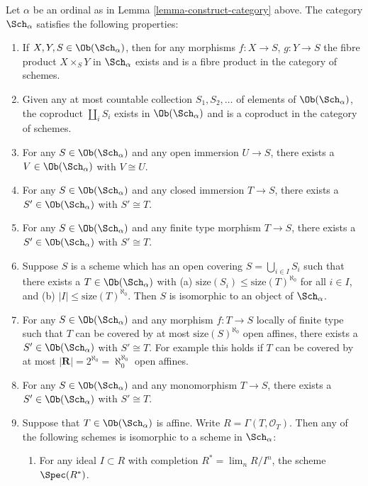 \begin{lemma}
\label{lemma-what-is-in-it}
Let $\alpha$ be an ordinal as in Lemma \ref{lemma-construct-category} above.
The category $\Sch_\alpha$ satisfies the following
properties:
\begin{enumerate}
\item If $X, Y, S \in \Ob(\Sch_\alpha)$, then
for any morphisms $f : X \to S$, $g : Y \to S$ the fibre
product $X \times_S Y$ in $\Sch_\alpha$ exists
and is a fibre product in the category of schemes.
\item Given any at most countable collection $S_1, S_2, \ldots$
of elements of $\Ob(\Sch_\alpha)$, the coproduct
$\coprod_i S_i$ exists in $\Ob(\Sch_\alpha)$ and
is a coproduct in the category of schemes.
\item For any $S \in \Ob(\Sch_\alpha)$ and
any open immersion $U \to S$, there exists a
$V \in \Ob(\Sch_\alpha)$ with $V \cong U$.
\item For any $S \in \Ob(\Sch_\alpha)$ and
any closed immersion $T \to S$, there exists a
$S' \in \Ob(\Sch_\alpha)$ with $S' \cong T$.
\item For any $S \in \Ob(\Sch_\alpha)$ and
any finite type morphism $T \to S$, there exists a
$S' \in \Ob(\Sch_\alpha)$ with $S' \cong T$.
\item Suppose $S$ is a scheme which has an open covering
$S = \bigcup_{i \in I} S_i$ such that there exists
a $T \in \Ob(\Sch_\alpha)$ with
(a) $\text{size}(S_i) \leq \text{size}(T)^{\aleph_0}$ for all
$i \in I$, and (b) $|I| \leq \text{size}(T)^{\aleph_0}$.
Then $S$ is isomorphic to an object of $\Sch_\alpha$.
\item For any $S \in \Ob(\Sch_\alpha)$ and
any morphism $f : T \to S$ locally of finite type such
that $T$ can be covered by at most
$\text{size}(S)^{\aleph_0}$ open affines, there exists a
$S' \in \Ob(\Sch_\alpha)$ with $S' \cong T$.
For example this holds if $T$ can be covered by at most
$|\mathbf{R}| = 2^{\aleph_0} = \aleph_0^{\aleph_0}$ open affines.
\item For any $S \in \Ob(\Sch_\alpha)$ and
any monomorphism $T \to S$, there exists a
$S' \in \Ob(\Sch_\alpha)$ with $S' \cong T$.
\item Suppose that $T \in \Ob(\Sch_\alpha)$ is
affine. Write $R = \Gamma(T, \mathcal{O}_T)$.
Then any of the following schemes is isomorphic to a scheme
in $\Sch_\alpha$:
\begin{enumerate}
\item For any ideal $I \subset R$ with completion
$R^* = \lim_n R/I^n$, the scheme $\Spec(R^*)$.

\end{enumerate}
\end{enumerate}
\end{lemma}
